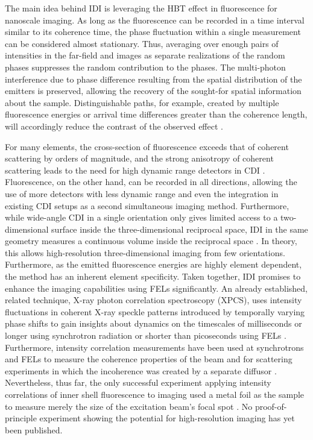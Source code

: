 The main idea behind IDI is leveraging the HBT effect in fluorescence for nanoscale imaging. As long as the fluorescence can be recorded in a time interval similar to its coherence time, the phase fluctuation within a single measurement can be considered almost stationary. Thus, averaging over enough pairs of intensities in the far-field and images as separate realizations of the random phases suppresses the random contribution to the phases.  The multi-photon interference due to phase difference resulting from the spatial distribution of the emitters is preserved,  allowing the recovery of the sought-for spatial information about the sample. Distinguishable paths, for example, created by multiple fluorescence energies or arrival time differences greater than the coherence length, will accordingly reduce the contrast of the observed effect \cite{classen2017,trost2020}. 

For many elements, the cross-section of fluorescence exceeds that of coherent scattering by orders of magnitude, and the strong anisotropy of coherent scattering leads to the need for high dynamic range detectors in CDI \cite{xraylib,attwood1999}.  Fluorescence, on the other hand, can be recorded in all directions, allowing the use of more detectors with less dynamic range and even the integration in existing CDI setups as a second simultaneous imaging method. Furthermore, while wide-angle CDI in a single orientation only gives limited access to a two-dimensional surface inside the three-dimensional reciprocal space, IDI in the same geometry measures a continuous volume inside the reciprocal space  \cite{barke2015,classen2017}. In theory, this allows high-resolution three-dimensional imaging from few orientations. Furthermore, as the emitted fluorescence energies are highly element dependent, the method has an inherent element specificity. Taken together, IDI promises to enhance the imaging capabilities using FELs significantly. An already established, related technique, X-ray photon correlation spectroscopy (XPCS), uses intensity fluctuations in coherent X-ray speckle patterns introduced by temporally varying phase shifts to gain insights about dynamics on the timescales of milliseconds or longer using synchrotron radiation or shorter than picoseconds using FELs \cite{lehmkuhler2021,grubel2007}. Furthermore, intensity correlation measurements have been used at synchrotrons and FELs to measure the coherence properties of the beam and for scattering experiments in which the incoherence was created by a separate diffusor \cite{yabashi2002,singer2013,inoue2019,gorobtsov2018,schneider2018}.  Nevertheless, thus far, the only successful experiment applying intensity correlations of inner shell fluorescence to imaging used a metal foil as the sample to measure merely the size of the excitation beam's focal spot \cite{nakumura2020}. No proof-of-principle experiment showing the potential for high-resolution imaging has yet been published. 

